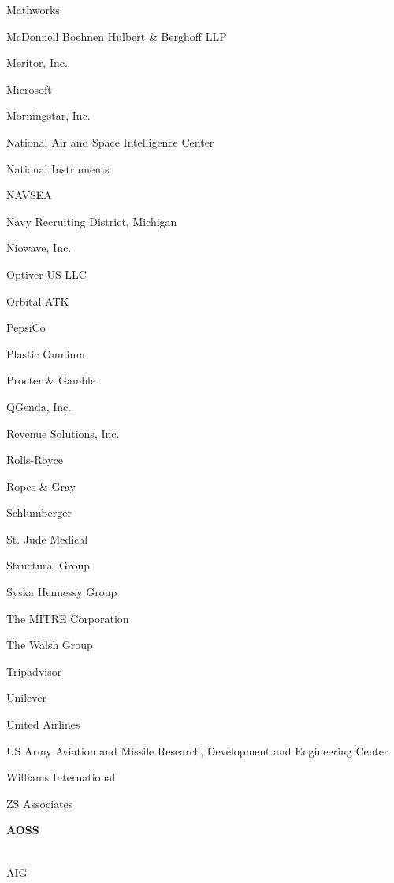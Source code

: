\documentclass[twoside]{article}
\begin{document}
\begin{center}
\begin{multicols}{5}
\begin{FlushLeft}
\begin{compactitem}
\item Mathworks
\item McDonnell Boehnen Hulbert \& Berghoff LLP
\item Meritor, Inc.
\item Microsoft
\item Morningstar, Inc.
\item National Air and Space Intelligence Center
\item National Instruments
\item NAVSEA
\item Navy Recruiting District, Michigan
\item Niowave, Inc.
\item Optiver US LLC
\item Orbital ATK
\item PepsiCo
\item Plastic Omnium
\item Procter \& Gamble
\item QGenda, Inc.
\item Revenue Solutions, Inc.
\item Rolls-Royce
\item Ropes \& Gray
\item Schlumberger
\item St. Jude Medical
\item Structural Group
\item Syska Hennessy Group
\item The MITRE Corporation
\item The Walsh Group
\item Tripadvisor
\item Unilever
\item United Airlines
\item US Army Aviation and Missile Research, Development and Engineering Center
\item Williams International
\item ZS Associates
\end{compactitem}
        \end{FlushLeft}
        \vspace{1em}
        {\fontsize{14}{16}\selectfont \bf AOSS}\\
        \vspace{-1em}
        ~\hrulefill~
        \vspace{-.9em}
        \begin{FlushLeft}
        \begin{compactitem}
        \item AIG

\end{compactitem}
\end{FlushLeft}
\end{multicols}
\end{center}
\end{document}
